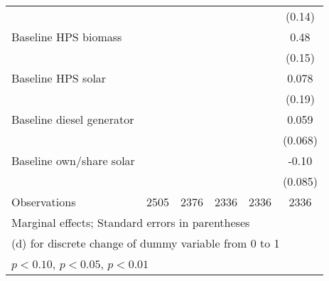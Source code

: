 \begin{table}[htbp]
\begin{tabular*}{1\hsize}{@{\hskip\tabcolsep\extracolsep\fill}l*{5}{c}}
                &                  &                  &                  &                  &   (0.14)         \\
Baseline HPS biomass&                  &                  &                  &                  &     0.48\sym{***}\\
                &                  &                  &                  &                  &   (0.15)         \\
Baseline HPS solar&                  &                  &                  &                  &    0.078         \\
                &                  &                  &                  &                  &   (0.19)         \\
Baseline diesel generator&                  &                  &                  &                  &    0.059         \\
                &                  &                  &                  &                  &  (0.068)         \\
Baseline own/share solar&                  &                  &                  &                  &    -0.10         \\
                &                  &                  &                  &                  &  (0.085)         \\
\midrule
Observations    &     2505         &     2376         &     2336         &     2336         &     2336         \\
\bottomrule
\multicolumn{6}{l}{\footnotesize Marginal effects; Standard errors in parentheses}\\
\multicolumn{6}{l}{\footnotesize  (d) for discrete change of dummy variable from 0 to 1}\\
\multicolumn{6}{l}{\footnotesize \sym{*} \(p<0.10\), \sym{**} \(p<0.05\), \sym{***} \(p<0.01\)}\\
\end{tabular*}
\end{table}
